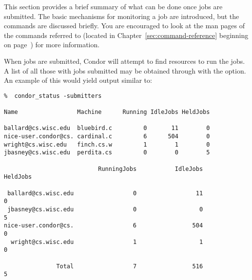 This section provides a brief summary of what can be done once jobs
are submitted. The basic mechanisms for monitoring a job are
introduced, but the commands are discussed briefly.
You are encouraged to
look at the man pages of the commands referred to (located in
Chapter~\ref{sec:command-reference} beginning on
page~\pageref{sec:command-reference}) for more information. 

When jobs are submitted, Condor will attempt to find resources
to run the jobs. 
A list of all those with jobs submitted
may be obtained through 
with the 
 option. 
An example of this would yield output similar to:
\footnotesize
\begin{verbatim}
%  condor_status -submitters

Name                 Machine      Running IdleJobs HeldJobs

ballard@cs.wisc.edu  bluebird.c         0       11        0
nice-user.condor@cs. cardinal.c         6      504        0
wright@cs.wisc.edu   finch.cs.w         1        1        0
jbasney@cs.wisc.edu  perdita.cs         0        0        5

                           RunningJobs           IdleJobs           HeldJobs

 ballard@cs.wisc.edu                 0                 11                  0
 jbasney@cs.wisc.edu                 0                  0                  5
nice-user.condor@cs.                 6                504                  0
  wright@cs.wisc.edu                 1                  1                  0

               Total                 7                516                  5
\end{verbatim}
\normalsize

